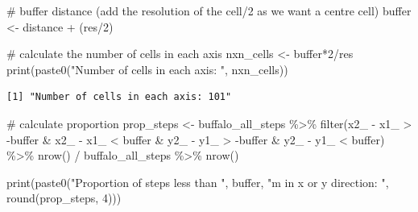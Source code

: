 \documentclass[
  letterpaper,
  DIV=11,
  numbers=noendperiod]{scrartcl}
\newenvironment{Shaded}{\begin{snugshade}}{\end{snugshade}}
\newcommand{\CommentTok}[1]{\textcolor[rgb]{0.37,0.37,0.37}{#1}}
\newcommand{\DecValTok}[1]{\textcolor[rgb]{0.68,0.00,0.00}{#1}}
\newcommand{\FunctionTok}[1]{\textcolor[rgb]{0.28,0.35,0.67}{#1}}
\newcommand{\NormalTok}[1]{\textcolor[rgb]{0.00,0.23,0.31}{#1}}
\newcommand{\OtherTok}[1]{\textcolor[rgb]{0.00,0.23,0.31}{#1}}
\newcommand{\SpecialCharTok}[1]{\textcolor[rgb]{0.37,0.37,0.37}{#1}}
\newcommand{\StringTok}[1]{\textcolor[rgb]{0.13,0.47,0.30}{#1}}
\begin{document}
\begin{Shaded}
\begin{Highlighting}[]
\CommentTok{\# buffer distance (add the resolution of the cell/2 as we want a centre cell)}
\NormalTok{buffer }\OtherTok{\textless{}{-}}\NormalTok{ distance }\SpecialCharTok{+}\NormalTok{ (res}\SpecialCharTok{/}\DecValTok{2}\NormalTok{)}

\CommentTok{\# calculate the number of cells in each axis}
\NormalTok{nxn\_cells }\OtherTok{\textless{}{-}}\NormalTok{ buffer}\SpecialCharTok{*}\DecValTok{2}\SpecialCharTok{/}\NormalTok{res}
\FunctionTok{print}\NormalTok{(}\FunctionTok{paste0}\NormalTok{(}\StringTok{"Number of cells in each axis: "}\NormalTok{, nxn\_cells))}
\end{Highlighting}
\end{Shaded}

\begin{verbatim}
[1] "Number of cells in each axis: 101"
\end{verbatim}

\begin{Shaded}
\begin{Highlighting}[]
\CommentTok{\# calculate proportion}
\NormalTok{prop\_steps }\OtherTok{\textless{}{-}}\NormalTok{ buffalo\_all\_steps }\SpecialCharTok{\%\textgreater{}\%} \FunctionTok{filter}\NormalTok{(x2\_ }\SpecialCharTok{{-}}\NormalTok{ x1\_ }\SpecialCharTok{\textgreater{}} \SpecialCharTok{{-}}\NormalTok{buffer }\SpecialCharTok{\&} 
\NormalTok{                                             x2\_ }\SpecialCharTok{{-}}\NormalTok{ x1\_ }\SpecialCharTok{\textless{}}\NormalTok{ buffer }\SpecialCharTok{\&}
\NormalTok{                                             y2\_ }\SpecialCharTok{{-}}\NormalTok{ y1\_ }\SpecialCharTok{\textgreater{}} \SpecialCharTok{{-}}\NormalTok{buffer }\SpecialCharTok{\&} 
\NormalTok{                                             y2\_ }\SpecialCharTok{{-}}\NormalTok{ y1\_ }\SpecialCharTok{\textless{}}\NormalTok{ buffer) }\SpecialCharTok{\%\textgreater{}\%} 
  \FunctionTok{nrow}\NormalTok{() }\SpecialCharTok{/}\NormalTok{ buffalo\_all\_steps }\SpecialCharTok{\%\textgreater{}\%} \FunctionTok{nrow}\NormalTok{()}

\FunctionTok{print}\NormalTok{(}\FunctionTok{paste0}\NormalTok{(}\StringTok{"Proportion of steps less than "}\NormalTok{, buffer, }\StringTok{"m in x or y direction: "}\NormalTok{, }\FunctionTok{round}\NormalTok{(prop\_steps, }\DecValTok{4}\NormalTok{)))}
\end{Highlighting}
\end{Shaded}
\end{document}
